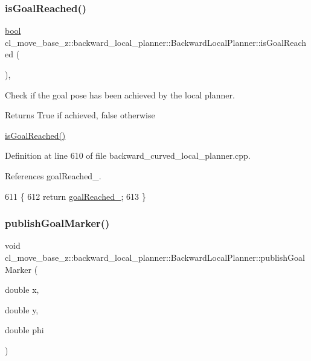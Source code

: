 \subsubsection{\texorpdfstring{is\+Goal\+Reached()}{isGoalReached()}}
{\footnotesize\ttfamily \hyperlink{classbool}{bool} cl\+\_\+move\+\_\+base\+\_\+z\+::backward\+\_\+local\+\_\+planner\+::\+Backward\+Local\+Planner\+::is\+Goal\+Reached (\begin{DoxyParamCaption}{ }\end{DoxyParamCaption})\hspace{0.3cm}{\ttfamily [override]}, {\ttfamily [virtual]}}



Check if the goal pose has been achieved by the local planner. 

\begin{DoxyReturn}{Returns}
True if achieved, false otherwise
\end{DoxyReturn}
\hyperlink{classcl__move__base__z_1_1backward__local__planner_1_1BackwardLocalPlanner_a06a99e609ed31b97f765351dd6827722}{is\+Goal\+Reached()} 

Definition at line 610 of file backward\+\_\+curved\+\_\+local\+\_\+planner.\+cpp.



References goal\+Reached\+\_\+.


\begin{DoxyCode}
611         \{
612             \textcolor{keywordflow}{return} \hyperlink{classcl__move__base__z_1_1backward__local__planner_1_1BackwardLocalPlanner_ad443c52ef585a8eab0364f0909222f51}{goalReached\_};
613         \}
\end{DoxyCode}
\mbox{\label{classcl__move__base__z_1_1backward__local__planner_1_1BackwardLocalPlanner_a70eaeb6cf31fd3378d9fbf9bcb975995}} 
\subsubsection{\texorpdfstring{publish\+Goal\+Marker()}{publishGoalMarker()}}
{\footnotesize\ttfamily void cl\+\_\+move\+\_\+base\+\_\+z\+::backward\+\_\+local\+\_\+planner\+::\+Backward\+Local\+Planner\+::publish\+Goal\+Marker (\begin{DoxyParamCaption}\item[{double}]{x,  }\item[{double}]{y,  }\item[{double}]{phi }\end{DoxyParamCaption})\hspace{0.3cm}{\ttfamily [private]}}

